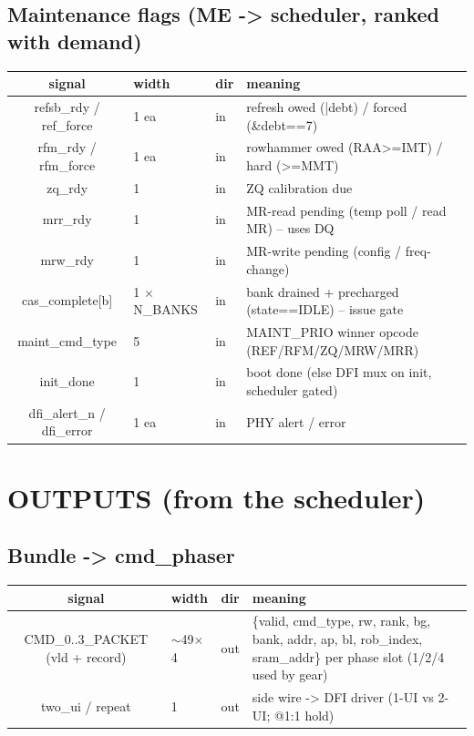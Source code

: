 \documentclass[9pt]{extarticle}
\newenvironment{io}{%
  \footnotesize\begin{longtable}{S W P M}
  \rowcolor{hb}\textbf{signal} & \textbf{width} & \textbf{dir} & \textbf{meaning}\\ \midrule\endhead}
  {\bottomrule\end{longtable}}
\begin{document}
\subsection{Maintenance flags  (ME -> scheduler, ranked with demand)}
\begin{io}
refsb\_rdy / ref\_force & 1 ea & \textcolor{ingr}{in} & refresh owed (|debt) / forced (\&debt==7)\\
rfm\_rdy / rfm\_force & 1 ea & \textcolor{ingr}{in} & rowhammer owed (RAA>=IMT) / hard (>=MMT)\\
zq\_rdy & 1 & \textcolor{ingr}{in} & ZQ calibration due\\
mrr\_rdy & 1 & \textcolor{ingr}{in} & MR-read pending (temp poll / read MR) -- uses DQ\\
mrw\_rdy & 1 & \textcolor{ingr}{in} & MR-write pending (config / freq-change)\\
cas\_complete[b] & 1 $\times$N\_BANKS & \textcolor{ingr}{in} & bank drained + precharged (state==IDLE) -- issue gate\\
maint\_cmd\_type & 5 & \textcolor{ingr}{in} & MAINT\_PRIO winner opcode (REF/RFM/ZQ/MRW/MRR)\\
init\_done & 1 & \textcolor{ingr}{in} & boot done (else DFI mux on init, scheduler gated)\\
dfi\_alert\_n / dfi\_error & 1 ea & \textcolor{ingr}{in} & PHY alert / error\\
\end{io}

\section{OUTPUTS  (from the scheduler)}
\subsection{Bundle -> cmd\_phaser}
\begin{io}
CMD\_0..3\_PACKET (vld + record) & $\sim$49$\times$4 & \textcolor{outg}{out} & \{valid, cmd\_type, rw, rank, bg, bank, addr, ap, bl, rob\_index, sram\_addr\} per phase slot (1/2/4 used by gear)\\
two\_ui / repeat & 1 & \textcolor{outg}{out} & side wire -> DFI driver (1-UI vs 2-UI; @1:1 hold)\\
\end{io}
\end{document}
